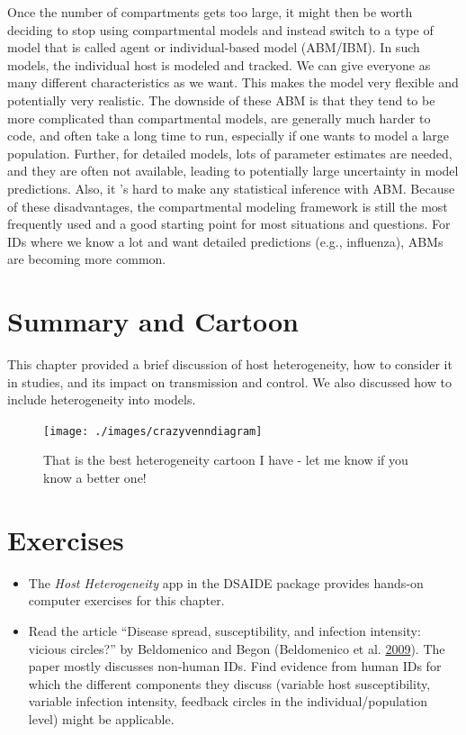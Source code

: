 \documentclass[
]{book}
\providecommand{\tightlist}{%
  \setlength{\itemsep}{0pt}\setlength{\parskip}{0pt}}
\begin{document}
Once the number of compartments gets too large, it might then be worth deciding to stop using compartmental models and instead switch to a type of model that is called agent or individual-based model (ABM/IBM). In such models, the individual host is modeled and tracked. We can give everyone as many different characteristics as we want. This makes the model very flexible and potentially very realistic. The downside of these ABM is that they tend to be more complicated than compartmental models, are generally much harder to code, and often take a long time to run, especially if one wants to model a large population. Further, for detailed models, lots of parameter estimates are needed, and they are often not available, leading to potentially large uncertainty in model predictions. Also, it 's hard to make any statistical inference with ABM. Because of these disadvantages, the compartmental modeling framework is still the most frequently used and a good starting point for most situations and questions. For IDs where we know a lot and want detailed predictions (e.g., influenza), ABMs are becoming more common.

\hypertarget{summary-and-cartoon-10}{%
\section{Summary and Cartoon}\label{summary-and-cartoon-10}}

This chapter provided a brief discussion of host heterogeneity, how to consider it in studies, and its impact on transmission and control. We also discussed how to include heterogeneity into models.

\begin{figure}
\texttt{[image: ./images/crazyvenndiagram]} \caption{That is the best heterogeneity cartoon I have - let me know if you know a better one!}\label{fig:crazyvenndiagram}
\end{figure}

\hypertarget{exercises-10}{%
\section{Exercises}\label{exercises-10}}

\begin{itemize}
\tightlist
\item
  The \emph{Host Heterogeneity} app in the DSAIDE package provides hands-on computer exercises for this chapter.
\item
  Read the article ``Disease spread, susceptibility, and infection intensity: vicious circles?'' by Beldomenico and Begon (Beldomenico et al. \protect\hyperlink{ref-beldomenico09}{2009}). The paper mostly discusses non-human IDs. Find evidence from human IDs for which the different components they discuss (variable host susceptibility, variable infection intensity, feedback circles in the individual/population level) might be applicable.
\end{itemize}
\end{document}
